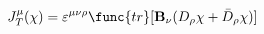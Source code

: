 \begin{equation}
J_T^{\mu}(\chi)=\varepsilon^{\mu\nu\rho}\func{tr}[{\bf B}_{\nu
}(D_{\rho }\chi +\bar{D}_{\rho }\chi )]
\end{equation}

